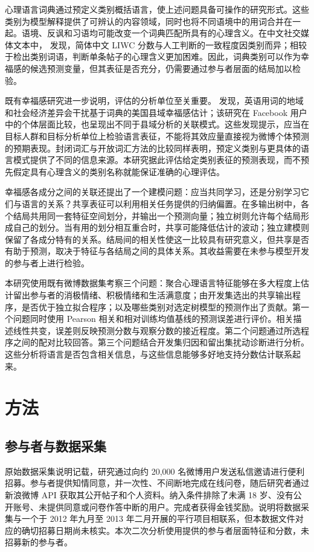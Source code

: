 心理语言词典通过预定义类别概括语言，使上述问题具备可操作的研究形式。这些类别为模型解释提供了可辨认的内容领域，同时也将不同语境中的用词合并在一起。语境、反讽和习语均可能改变一个词典匹配所具有的心理含义\citep{tausczik2010}。在中文社交媒体文本中，\citet{zhao2016} 发现，简体中文 LIWC 分数与人工判断的一致程度因类别而异；相较于检出类别词语，判断单条帖子的心理含义更加困难。因此，词典类别可以作为幸福感的候选预测变量，但其表征是否充分，仍需要通过参与者层面的结局加以检验。

既有幸福感研究进一步说明，评估的分析单位至关重要。\citet{jaidka2020} 发现，英语用词的地域和社会经济差异会干扰基于词典的美国县域幸福感估计；该研究在 Facebook 用户中的个体层面比较，也呈现出不同于县域分析的关联模式。这些发现提示，应当在目标人群和目标分析单位上检验语言表征，不能将其效应量直接视为微博个体预测的预期表现。封闭词汇与开放词汇方法的比较同样表明，预定义类别与更具体的语言模式提供了不同的信息来源\citep{eichstaedt2021}。本研究据此评估给定类别表征的预测表现，而不预先假定具有心理含义的类别名称就能保证准确的心理评估。

幸福感各成分之间的关联还提出了一个建模问题：应当共同学习，还是分别学习它们与语言的关系？共享表征可以利用相关任务提供的归纳偏置\citep{caruana1997}。在多输出树中，各个结局共用同一套特征空间划分，并输出一个预测向量；独立树则允许每个结局形成自己的划分\citep{kocev2007}。当有用的划分相互重合时，共享可能降低估计的波动；独立建模则保留了各成分特有的关系。结局间的相关性使这一比较具有研究意义，但共享是否有助于预测，取决于特征与各结局之间的具体关系。其收益需要在未参与模型开发的参与者上进行检验\citep{yarkoni2017}。

本研究使用既有微博数据集考察三个问题：聚合心理语言特征能够在多大程度上估计留出参与者的消极情绪、积极情绪和生活满意度；由开发集选出的共享输出程序，是否优于独立拟合程序；以及哪些类别对选定树模型的预测作出了贡献。第一个问题同时使用 Pearson 相关和相对训练均值基线的预测误差进行评价。相关描述线性共变，误差则反映预测分数与观察分数的接近程度。第二个问题通过所选程序之间的配对比较回答。第三个问题结合开发集归因和留出集扰动诊断进行分析。这些分析将语言是否包含相关信息，与这些信息能够多好地支持分数估计联系起来。

\section{方法}
\subsection{参与者与数据采集}
原始数据采集说明记载，研究通过向约 20,000 名微博用户发送私信邀请进行便利招募。参与者提供知情同意，并一次性、不间断地完成在线问卷，随后研究者通过新浪微博 API 获取其公开帖子和个人资料。纳入条件排除了未满 18 岁、没有公开账号、未提供同意或问卷作答中断的用户。完成者获得金钱奖励。说明将数据采集与一个于 2012 年九月至 2013 年二月开展的平行项目相联系，但本数据文件对应的确切招募日期尚未核实。本次二次分析使用提供的参与者层面特征和分数，未招募新的参与者。

